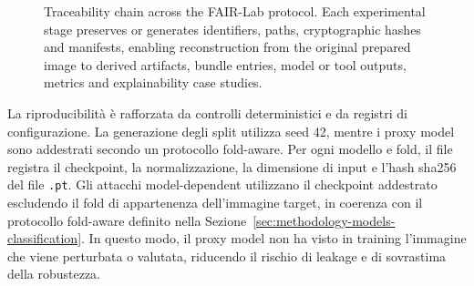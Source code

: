 \begin{figure}[H]
{%
}
\caption[Traceability chain across the FAIR-Lab protocol]{Traceability chain across the FAIR-Lab protocol. Each experimental stage preserves or generates identifiers, paths, cryptographic hashes and manifests, enabling reconstruction from the original prepared image to derived artifacts, bundle entries, model or tool outputs, metrics and explainability case studies.}
\label{fig:methodology-traceability-chain}
\end{figure}


La riproducibilità è rafforzata da controlli deterministici e da registri di
configurazione. La generazione degli split utilizza seed 42, mentre i proxy
model sono addestrati secondo un protocollo fold-aware. Per ogni modello e fold,
il file  registra il checkpoint, la
normalizzazione, la dimensione di input e l'hash \gls{sha256} del file
\texttt{.pt}. Gli attacchi model-dependent utilizzano il checkpoint addestrato escludendo il
fold di appartenenza dell'immagine target, in coerenza con il protocollo
fold-aware definito nella Sezione~\ref{sec:methodology-models-classification}.
In questo modo, il proxy model non ha visto in training l'immagine che viene
perturbata o valutata, riducendo il rischio di leakage e di sovrastima della
robustezza.

